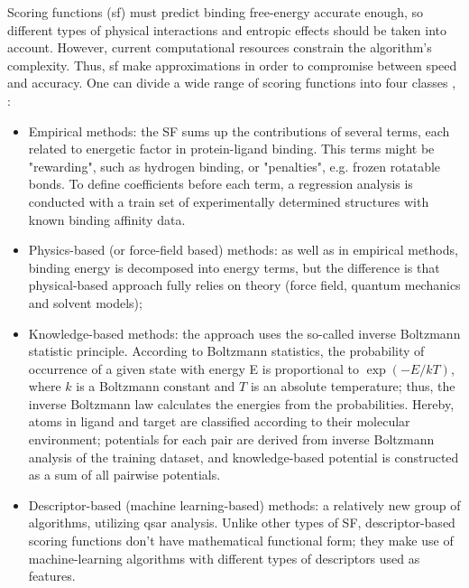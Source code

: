   Scoring functions (\acrshort{sf}) must predict binding free-energy accurate enough, so different types of physical interactions and entropic effects should be taken into account.
  However, current computational resources constrain the algorithm's complexity.
  Thus, \acrshort{sf} make approximations in order to compromise between speed and accuracy. One can divide a wide range of scoring functions into four classes {\cite{Liu2015ClassificationFunctions}, \cite{Li2019AnDocking}}:
  \begin{itemize}
        \item Empirical methods: the SF sums up the contributions of several terms, each related to energetic factor in protein-ligand binding.
        This terms might be "rewarding", such as hydrogen binding, or "penalties", e.g. frozen rotatable bonds.
        To define coefficients before each term, a regression analysis is conducted with a train set of experimentally determined structures with known binding affinity data.
       \item Physics-based (or force-field based) methods: as well as in empirical methods, binding energy is decomposed into energy terms, but the difference is that physical-based approach fully relies on theory (force field, quantum mechanics and solvent models);
      \item Knowledge-based methods: the approach uses the so-called inverse Boltzmann statistic principle.
      According to Boltzmann statistics, the probability of occurrence of a given state with energy E is proportional to $\exp{(-E/kT)}$, where $k$ is a Boltzmann constant and $T$ is an absolute temperature; thus, the inverse Boltzmann law calculates the energies from the probabilities.
      Hereby, atoms in ligand and target are classified according to their molecular environment; potentials for each pair are derived from inverse Boltzmann analysis of the training dataset, and knowledge-based potential is constructed as a sum of all pairwise potentials.
      \item Descriptor-based (machine learning-based) methods: a relatively new group of algorithms, utilizing \acrshort{qsar} analysis.
      Unlike other types of SF, descriptor-based scoring functions don't have mathematical functional form; they make use of machine-learning algorithms with different types of descriptors used as features. 
  \end{itemize}

